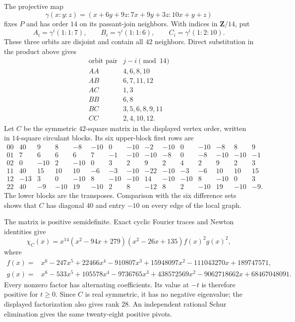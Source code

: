 \documentclass[11pt]{article}
\theoremstyle{definition}
\theoremstyle{remark}
\begin{document}
The projective map
\[
 \gamma(x:y:z)=
 (x+6y+9z:7x+9y+3z:10x+y+z)
\]
fixes \(P\) and has order \(14\) on its passant-join neighbors.  With indices
in \(\mathbf Z/14\), put
\[
 A_i=\gamma^i(1:1:7),\qquad
 B_i=\gamma^i(1:1:6),\qquad
 C_i=\gamma^i(1:2:10).
\]
These three orbits are disjoint and contain all \(42\) neighbors.  Direct
substitution in the product above gives
\[
\begin{array}{c|c}
\text{orbit pair}&j-i\pmod {14}\\ \hline
AA&4,6,8,10\\
AB&6,7,11,12\\
AC&1,3\\
BB&6,8\\
BC&3,5,6,8,9,11\\
CC&2,4,10,12.
\end{array}
\]
Let \(C\) be the symmetric \(42\)-square matrix in the displayed vertex
order, written in \(14\)-square circulant blocks.  Its six upper-block first
rows are
\[
\begin{array}{c|rrrrrrrrrrrrrr}
00&40&9&8&-8&-10&0&-10&-2&-10&0&-10&-8&8&9\\
01&7&6&6&6&7&-1&-10&-10&-8&0&-8&-10&-10&-1\\
02&0&-10&2&-10&0&3&2&9&2&4&2&9&2&3\\
11&40&15&10&10&-6&-3&-10&-22&-10&-3&-6&10&10&15\\
12&-13&3&0&-10&8&-10&-10&14&-10&-10&8&-10&0&3\\
22&40&-9&-10&19&-10&2&8&-12&8&2&-10&19&-10&-9.
\end{array}
\]
The lower blocks are the transposes.  Comparison with the six difference
sets shows that \(C\) has diagonal \(40\) and entry \(-10\) on every edge
of the local graph.

The matrix is positive semidefinite.  Exact cyclic Fourier traces and Newton
identities give
\[
 \chi_C(x)=x^{14}(x^2-94x+279)(x^2-26x+135)f(x)^2g(x)^2,
\]
where
\[
\begin{aligned}
f(x)={}&x^6-247x^5+22466x^4-910807x^3
 +15948097x^2-111043270x+189747571,\\
g(x)={}&x^6-533x^5+105578x^4-9736765x^3
 +438572569x^2-9062718662x+68467048091.
\end{aligned}
\]
Every nonzero factor has alternating coefficients.  Its value at \(-t\) is
therefore positive for \(t\ge0\).  Since \(C\) is real symmetric, it has no
negative eigenvalue; the displayed factorization also gives rank \(28\).
An independent rational Schur elimination gives the same twenty-eight
positive pivots.
\end{document}
